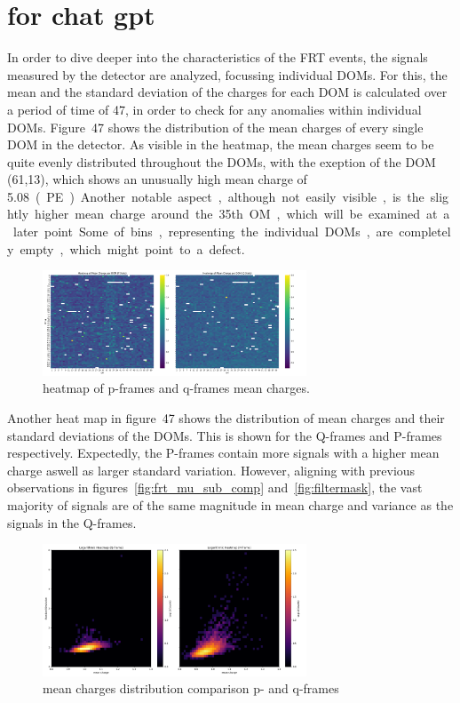 \section{for chat gpt}

In order to dive deeper into the characteristics of the FRT events, the signals measured by the detector are analyzed, focussing individual 
DOMs. For this, the mean and the standard deviation of the charges for each DOM is calculated over a period of time of \num{47}, in order to check for any anomalies
within individual DOMs. Figure~47 shows the distribution of the mean charges of every single DOM in the detector. As visible in the heatmap, the mean charges seem to 
be quite evenly distributed throughout the DOMs, with the exeption of the DOM (61,13), which shows an unusually high mean charge of \num{5.08}~\unit(PE). Another 
notable aspect, although not easily visible, is the slightly higher mean charge around the 35th OM, which will be examined at a later point. Some of bins, representing 
the individual DOMs, are completely empty, which 
might point to a defect. 


\begin{figure}
    \centering
    \includegraphics[width=0.7\textwidth]{Plots/mean_charge_all_dom.png}
    \caption{heatmap of p-frames and q-frames mean charges.}
\end{figure}

Another heat map in figure~47 shows the distribution of mean charges and their standard deviations of the DOMs. This is shown for the Q-frames and P-frames 
respectively. Expectedly, the P-frames contain more signals with a higher mean charge aswell as larger standard variation. However, aligning with previous observations
in figures~\ref{fig:frt_mu_sub_comp} and~\ref{fig:filtermask}, the vast majority of signals are of the same magnitude in mean charge and variance as the signals in the 
Q-frames.

\begin{figure}
    \centering
    \includegraphics[width=0.7\textwidth]{Plots/mean_std_charge.png}
    \caption{mean charges distribution comparison p- and q-frames}
\end{figure}

